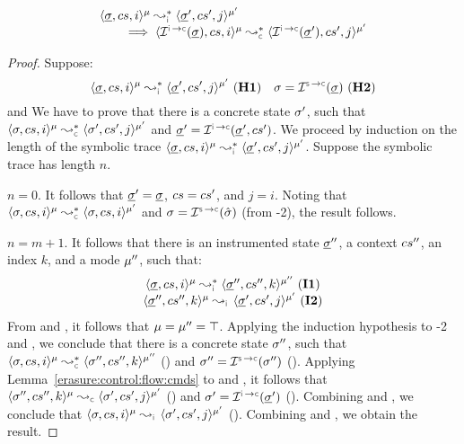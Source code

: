\begin{temax}
$$
\begin{array}{l} 
\transabssemrule{\istate, \cs, i}{\istate', \cs', j}{\mode}{\mode'}{\instrumented} \\ \quad \quad
\implies \transabssemrule{\interpret{\instconc}{}(\istate), \cs, i}{\interpret{\instconc}{}(\istate'), \cs', j}{\mode}{\mode'}{\concrete} 
 \end{array}
$$
\end{temax}
\begin{proof}
Suppose:
$$
\transabssemrule{\istate, \cs, i}{\istate', \cs', j}{\mode}{\mode'}{\instrumented} \text{ (\hyp{1})}
\quad 
 \jstate = \interpret{\symbconc}{}(\istate) \text{ (\hyp{2})}
 $$
and
We have to prove that there is a concrete state $\sigma'$,
such that $\transabssemrule{\jstate, \cs, i}{\jstate', \cs', j}{\mode}{\mode'}{\concrete}$ and
$\istate' = \interpret{\instconc}{}(\istate', \cs')$.
We proceed by induction on the length of the symbolic trace 
$\transabssemrule{\istate, \cs, i}{\istate', \cs', j}{\mode}{\mode'}{\instrumented}$. 
Suppose the symbolic trace has length $n$. 
\vspace{6pt}

\noindent {} $n = 0$. It follows that $\underline{\sigma}' = \underline{\sigma}$, 
$cs = cs'$, and $j = i$. Noting that 
$\transabssemrule{\jstate, \cs, i}{\jstate, \cs, i}{\mode}{\mode'}{\concrete}$
and 
$\jstate = \interpret{\symbconc}{}(\sstate)$ (from \hyp{2}), 
the result follows. 
\vspace{6pt}


\noindent {} $n = m + 1$. It follows that there is an instrumented state 
$\underline{\sigma}''$, a context $cs''$, an index $k$, and a mode $\mu''$, such that: 
$$
\begin{array}{c}
\transabssemrule{\istate, \cs, i}{\istate'', \cs'', k}{\mode}{\mode''}{\instrumented} \text{ (\ieq{1})} \\ 
\abssemrule{\istate'', \cs'', k}{\istate', \cs', j}{\mode}{\mode'}{\instrumented} \text{ (\ieq{2})}
\end{array}
$$
From  and , it follows that $\mu = \mu'' = \top$. 
Applying the induction hypothesis to \hyp{2} and , we conclude that 
there is a concrete state $\sigma''$, such that
$\transabssemrule{\jstate, \cs, i}{\jstate'', \cs'', k}{\mode}{\mode''}{\concrete}$ () and 
$\jstate'' = \interpret{\symbconc}{}(\jstate'')$ ().
Applying Lemma~\ref{erasure:control:flow:cmds} to  and ,
it follows that  
$\abssemrule{\jstate'', \cs'', k}{\jstate', \cs', j}{\mode}{\mode'}{\concrete}$ ()
and 
$\jstate' = \interpret{\instconc}{}(\istate')$ ().
Combining  and , we conclude that 
$\abssemrule{\jstate, \cs, i}{\jstate', \cs', j}{\mode}{\mode'}{\instrumented}$ (). 
Combining  and , we obtain the result. 
\end{proof}


